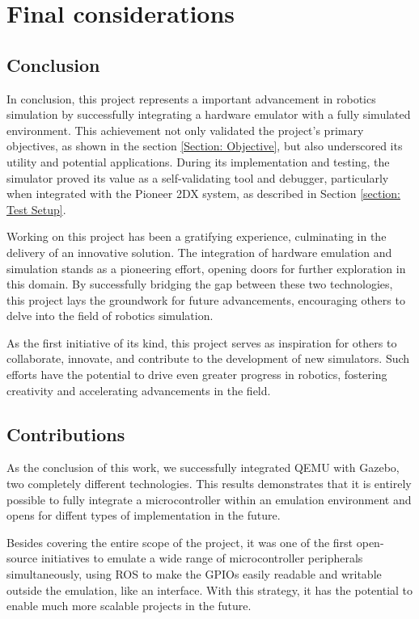 \documentclass[../monografia.tex]{subfiles}
\begin{document}
\chapter{Final considerations}

\section{Conclusion}

In conclusion, this project represents a important advancement in robotics simulation by successfully integrating a hardware emulator with a fully simulated environment. This achievement not only validated the project's primary objectives, as shown in the section \ref{Section: Objective},  but also underscored its utility and potential applications. During its implementation and testing, the simulator proved its value as a self-validating tool and debugger, particularly when integrated with the Pioneer 2DX system, as described in Section \ref{section: Test Setup}.

Working on this project has been a gratifying experience, culminating in the delivery of an innovative solution. The integration of hardware emulation and simulation stands as a pioneering effort, opening doors for further exploration in this domain. By successfully bridging the gap between these two technologies, this project lays the groundwork for future advancements, encouraging others to delve into the field of robotics simulation.

As the first initiative of its kind, this project serves as inspiration for others to collaborate, innovate, and contribute to the development of new simulators. Such efforts have the potential to drive even greater progress in robotics, fostering creativity and accelerating advancements in the field.

\section{Contributions}

As the conclusion of this work, we successfully integrated QEMU with Gazebo, two completely different technologies. This results demonstrates that it is entirely possible to fully integrate a microcontroller within an emulation environment and opens for diffent types of implementation in the future.

Besides covering the entire scope of the project, it was one of the first open-source initiatives to emulate a wide range of microcontroller peripherals simultaneously, using ROS to make the GPIOs easily readable and writable outside the emulation, like an interface. With this strategy, it has the potential to enable much more scalable projects in the future.
\end{document}
